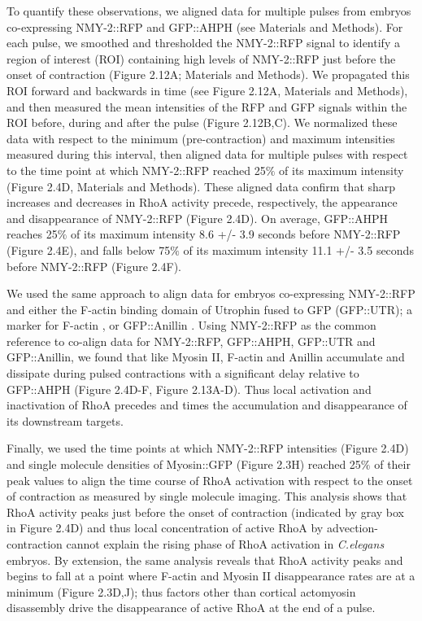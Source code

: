 \documentclass{ucetd}
\begin{document}
To quantify these observations, we aligned data for multiple pulses from embryos co-expressing NMY-2::RFP and GFP::AHPH (see Materials and Methods). For each pulse, we smoothed and thresholded the NMY-2::RFP signal to identify a region of interest (ROI) containing high levels of NMY-2::RFP just before the onset of contraction (Figure 2.12A; Materials and Methods). We propagated this ROI forward and backwards in time (see Figure 2.12A, Materials and Methods), and then measured the mean intensities of the RFP and GFP signals within the ROI before, during and after the pulse (Figure 2.12B,C). We normalized these data with respect to the minimum (pre-contraction) and maximum intensities measured during this interval, then aligned data for multiple pulses with respect to the time point at which NMY-2::RFP reached 25$\%$ of its maximum intensity (Figure 2.4D, Materials and Methods). These aligned data confirm that sharp increases and decreases in RhoA activity precede, respectively, the appearance and disappearance of NMY-2::RFP (Figure 2.4D).  On average, GFP::AHPH reaches 25$\%$ of its maximum intensity 8.6 +/- 3.9 seconds before NMY-2::RFP (Figure 2.4E), and falls below 75$\%$ of its maximum intensity 11.1 +/- 3.5 seconds before NMY-2::RFP (Figure 2.4F).

We used the same approach to align data for embryos co-expressing NMY-2::RFP and either the F-actin binding domain of Utrophin fused to GFP (GFP::UTR); a marker for F-actin \cite{Burkel:2007fj,Tse:2012fp}, or GFP::Anillin \cite{Maddox:2007cx}. Using NMY-2::RFP as the common reference to co-align data for NMY-2::RFP, GFP::AHPH, GFP::UTR and GFP::Anillin, we found that like Myosin II, F-actin and Anillin accumulate and dissipate during pulsed contractions with a significant delay relative to GFP::AHPH (Figure 2.4D-F, Figure 2.13A-D). Thus local activation and inactivation of RhoA precedes and times the accumulation and disappearance of its downstream targets. 

Finally, we used the time points at which NMY-2::RFP intensities (Figure 2.4D) and single molecule densities of Myosin::GFP (Figure 2.3H) reached 25$\%$ of their peak values to align the time course of RhoA activation with respect to the onset of contraction as measured by single molecule imaging.  This analysis shows that RhoA activity peaks just before the onset of contraction (indicated by gray box in Figure 2.4D) and thus local concentration of active RhoA by advection-contraction \cite{Munjal:2015bx} cannot explain the rising phase of RhoA activation in \textit{C.elegans} embryos.  By extension, the same analysis reveals that RhoA activity peaks and begins to fall at a point where F-actin and Myosin II disappearance rates are at a minimum (Figure 2.3D,J); thus factors other than cortical actomyosin disassembly drive the disappearance of active RhoA at the end of a pulse.
\end{document}
